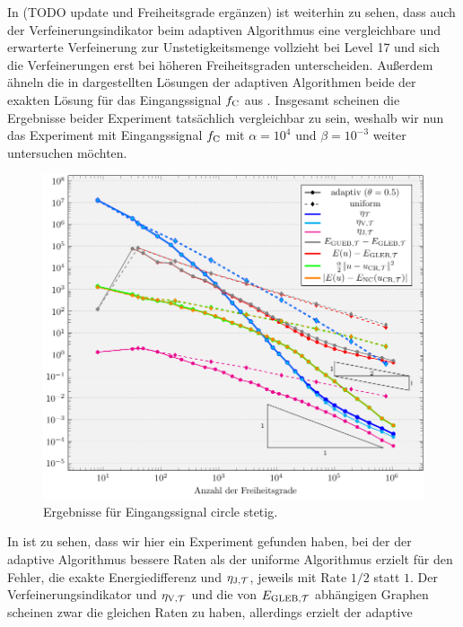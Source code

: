 In  (TODO update und Freiheitsgrade ergänzen) ist
weiterhin zu sehen, dass auch der
Verfeinerungsindikator beim adaptiven Algorithmus eine vergleichbare und
erwarterte Verfeinerung zur Unstetigkeitsmenge vollzieht bei
Level 17 und sich die Verfeinerungen erst bei höheren Freiheitsgraden 
unterscheiden. 
Außerdem ähneln die in  dargestellten Lösungen der
adaptiven Algorithmen beide der exakten Lösung für das Eingangssignal
$f_\textup{C}$ aus .
Insgesamt scheinen die Ergebnisse beider Experiment tatsächlich vergleichbar
zu sein, weshalb wir nun das Experiment mit Eingangssignal $f_\textup{C}$
mit $\alpha=10^4$ und $\beta=10^{-3}$ weiter untersuchen möchten.
\begin{figure}[p]
  \centering
  \includegraphics[width=\linewidth]
    {pictures/chapExperiments/secGrayscale/circ/convCont.pdf}
  \caption{Ergebnisse für Eingangssignal circle stetig.}
  \label{fig:circContConvergence}
\end{figure}
In  ist zu sehen, dass wir hier ein Experiment
gefunden haben, bei der der adaptive Algorithmus bessere Raten als
der uniforme Algorithmus erzielt für den Fehler, die exakte Energiedifferenz
und $\eta_{\textup{J}, \mathcal{T}}$, jeweils mit Rate $1/2$ statt $1$.
Der Verfeinerungsindikator und $\eta_{\textup{V}, \mathcal{T}}$ und die von $E_{\textup{GLEB}, \mathcal{T}}$ abhängigen Graphen
scheinen zwar die gleichen Raten zu haben, allerdings erzielt der adaptive
